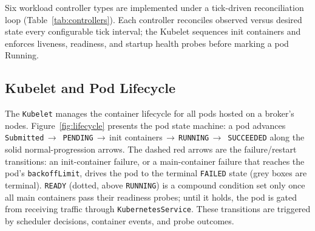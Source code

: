 \documentclass[ASNA,twocolumn]{USG}
\begin{document}
    Six workload controller types are implemented under a tick-driven
    reconciliation loop (Table~\ref{tab:controllers}). Each controller
    reconciles observed versus desired state every configurable tick
    interval; the Kubelet sequences init containers and enforces
    liveness, readiness, and startup health probes before marking a pod
    Running.

    \subsection{Kubelet and Pod Lifecycle}

    The \texttt{Kubelet} manages the container lifecycle for all pods
    hosted on a broker's nodes. Figure~\ref{fig:lifecycle} presents the
    pod state machine: a pod advances \texttt{Submitted}\,$\to$\,
    \texttt{PENDING}\,$\to$\,init containers\,$\to$\,\texttt{RUNNING}\,$\to$\,
    \texttt{SUCCEEDED} along the solid normal-progression arrows. The dashed
    red arrows are the failure/restart transitions: an init-container
    failure, or a main-container failure that reaches the pod's
    \texttt{backoffLimit}, drives the pod to the terminal \texttt{FAILED}
    state (grey boxes are terminal). \texttt{READY} (dotted, above
    \texttt{RUNNING}) is a compound condition set only once all main
    containers pass their readiness probes; until it holds, the pod is
    gated from receiving traffic through \texttt{KubernetesService}. These
    transitions are triggered by scheduler decisions, container events,
    and probe outcomes.
\end{document}

